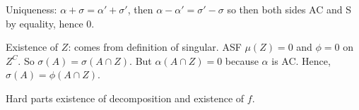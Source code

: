 \pf Uniqueness: $\alpha+\sigma= \alpha' + \sigma'$, then $\alpha-\alpha'= \sigma'-\sigma$ so then both sides AC and S by equality, hence 0. 



Existence of $Z$: comes from definition of singular. ASF $\mu(Z)=0$ and $\phi=0$ on $Z^C$. So $\sigma(A)= \sigma(A \cap Z)$. But $\alpha(A \cap Z)=0$ because $\alpha$ is AC. Hence, $\sigma(A)= \phi(A \cap Z)$. 

Hard parts existence of decomposition and existence of $f$. 








































